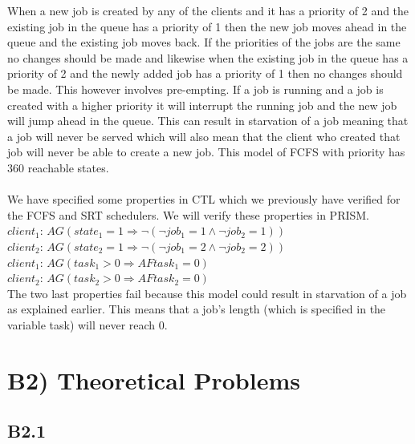 \documentclass[12pt]{report}
\begin{document}
When a new job is created by any of the clients and it has a priority of 2 and the existing job in the queue has a priority of 1 then the new job moves ahead in the queue and the existing job moves back. If the priorities of the jobs are the same no changes should be made and likewise when the existing job in the queue has a priority of 2 and the newly added job has a priority of 1 then no changes should be made. This however involves pre-empting. If a job is running and a job is created with a higher priority it will interrupt the running job and the new job will jump ahead in the queue. This can result in starvation of a job meaning that a job will never be served which will also mean that the client who created that job will never be able to create a new job. This model of FCFS with priority has 360 reachable states.\\
\\
We have specified some properties in CTL which we previously have verified for the FCFS and SRT schedulers. We will verify these properties in PRISM.\\
$client_1$: $AG (state_1 = 1 \Rightarrow \neg(\neg job_1 = 1 \wedge \neg job_2 = 1))$\\
$client_2$: $AG (state_2 = 1 \Rightarrow \neg(\neg job_1 = 2 \wedge \neg job_2 = 2))$\\
$client_1$: $AG(task_1>0 \Rightarrow AF task_1 = 0)$ \\
$client_2$: $AG(task_2>0 \Rightarrow AF task_2 = 0)$ \\

The two last properties fail because this model could result in starvation of a job as explained earlier. This means that a job's length (which is specified in the variable task) will never reach 0.

\section*{B2) Theoretical Problems}
\subsection*{B2.1}
\end{document}
